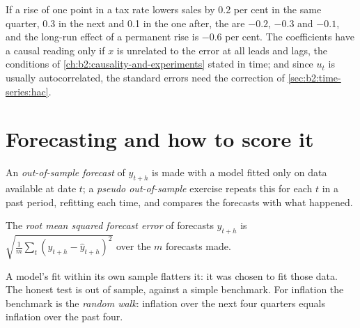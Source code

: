 If a rise of one point in a tax rate lowers sales by 0.2 per cent in the same quarter, 0.3 in the next and 0.1 in the one
after, the  are $-0.2$, $-0.3$ and $-0.1$, and the long-run effect of a permanent rise is $-0.6$ per
cent. The coefficients have a causal reading only if $x$ is unrelated to the error at all leads and lags, the conditions of
\cref{ch:b2:causality-and-experiments} stated in time; and since $u_t$ is usually autocorrelated, the standard errors need
the correction of \cref{sec:b2:time-series:hac}.

\section{Forecasting and how to score it}\label{sec:b2:time-series:forecasting}

\begin{definition}\label{def:b2:time-series:oos}
An \emph{out-of-sample forecast} of $y_{t+h}$ is made with a model fitted only on data
available at date $t$; a \emph{pseudo out-of-sample} exercise repeats this for each $t$ in a past period, refitting each
time, and compares the forecasts with what happened.
\end{definition}

\begin{definition}\label{def:b2:time-series:rmse}
The \emph{root mean squared forecast error} of forecasts $\hat y_{t+h}$ is
$\sqrt{\tfrac1m\sum_t(y_{t+h} - \hat y_{t+h})^2}$ over the $m$ forecasts made.
\end{definition}

A model's fit within its own sample flatters it: it was chosen to fit those data. The honest test is out of sample, against
a simple benchmark. For inflation the benchmark is the \emph{random walk}: inflation over the next four quarters equals
inflation over the past four.

\label{lst:b2:time-series:forecast}

\label{out:b2:time-series:forecast}

